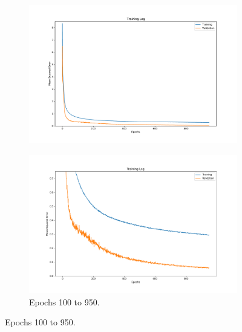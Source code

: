 \begin{figure}
     \centering
     \caption{Neural Network Training Log}
     \begin{subfigure}[b]{\textwidth}
         \centering
         \includegraphics[width=\textwidth]{project/img/ml_model/combined/combined_training_log.pdf}
     \end{subfigure}
     \begin{subfigure}[b]{\textwidth}
         \centering
         \caption{Epochs 100 to 950.}
         \includegraphics[width=\textwidth]{project/img/ml_model/combined/combined_training_log_inset.png}
         
     \end{subfigure}
        \label{fig:ml_model:nn_training}
\end{figure}





